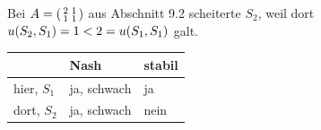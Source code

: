 \begin{aufgabe}
Bei $A = \begin{psmallmatrix}2&1\\1&1\end{psmallmatrix}$ aus Abschnitt 9.2 scheiterte $S_2$, weil dort $u(S_2,S_1) = 1 < 2 = u(S_1,S_1)$ galt.

\begin{center}
{\small
\renewcommand{\arraystretch}{1.5}
\begin{tabular}{@{}P{2.4cm}P{2.6cm}P{2.6cm}@{}}
\toprule
& \textbf{Nash} & \textbf{stabil}\\
\midrule
hier, $S_1$ & \textcolor{gruen}{ja, schwach} & \textcolor{gruen}{ja}\\
dort, $S_2$ & \textcolor{gruen}{ja, schwach} & \textcolor{akzent}{nein}\\
\bottomrule
\end{tabular}}
\end{center}

\begin{center}
\begin{minipage}{0.88\textwidth}
\end{minipage}
\end{center}
\end{aufgabe}

